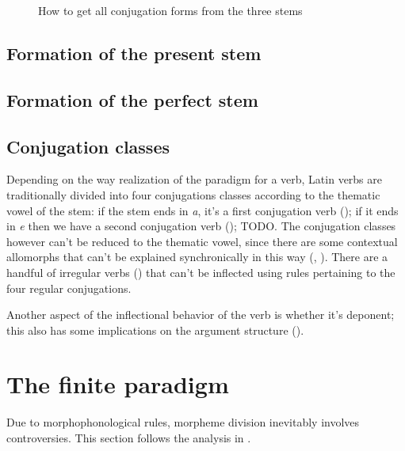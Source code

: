 \documentclass[a4paper, oneside, 12pt]{report}
\newcommand*{\citechap}[1]{chap.~{#1}}
\newcommand{\form}[1]{\emph{#1}}
\begin{document}
\begin{sidewaysfigure}
    \centering
    {\small }
    \caption{How to get all conjugation forms from the three stems}
    \label{fig:stem-to-form}
\end{sidewaysfigure}

\subsection{Formation of the present stem}


\subsection{Formation of the perfect stem}\label{sec:verb-inflection.stem.perfect}

\subsection{Conjugation classes}\label{sec:verb-morphology.stem.conjugation}

Depending on the way realization of the paradigm for a verb,
Latin verbs are traditionally divided into 
four conjugations classes
according to the thematic vowel of the stem:
if the stem ends in \form{a}, 
it's a first conjugation verb ();
if it ends in \form{e} 
then we have a second conjugation verb ();
TODO.
The conjugation classes however can't be reduced to 
the thematic vowel, 
since there are some contextual allomorphs that can't be explained synchronically
in this way
(, ).
There are a handful of irregular verbs ()
that can't be inflected using rules pertaining to the four regular conjugations.

Another aspect of the inflectional behavior of the verb
is whether it's deponent;
this also has some implications on 
the argument structure ().

\section{The finite paradigm}\label{sec:finite-paradigm}

Due to morphophonological rules, 
morpheme division inevitably involves controversies.
This section follows the analysis in \citet[\citechap{14}]{oniga2014latin}.
\end{document}
